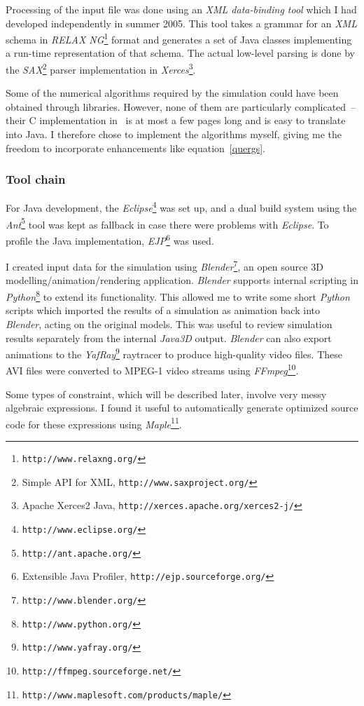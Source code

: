 Processing of the input file was done using an \textsl{XML data-binding tool} which I had
developed independently in summer 2005. This tool takes a grammar for an \textsl{XML} schema in
\textsl{RELAX NG}\footnote{\texttt{http://www.relaxng.org/}} format and generates a set of
Java classes implementing a run-time representation of that schema. The actual low-level parsing
is done by the \textsl{SAX}\footnote{Simple API for XML, \texttt{http://www.saxproject.org/}}
parser implementation in \textsl{Xerces}\footnote{Apache Xerces2 Java,
\texttt{http://xerces.apache.org/xerces2-j/}}.

Some of the numerical algorithms required by the simulation could have been obtained through
libraries. However, none of them are particularly complicated~-- their C implementation
in~\cite{NRinC} is at most a few pages long and is easy to translate into Java. I therefore chose
to implement the algorithms myself, giving me the freedom to incorporate enhancements like
equation~\ref{quergs}.

\subsubsection{Tool chain}
For Java development, the \textsl{Eclipse}\footnote{\texttt{http://www.eclipse.org/}} was set up,
and a dual build system using the \textsl{Ant}\footnote{\texttt{http://ant.apache.org/}} tool
was kept as fallback in case there were problems with \textsl{Eclipse}. To profile the Java
implementation, \textsl{EJP}\footnote{Extensible Java Profiler, \texttt{http://ejp.sourceforge.org/}}
was used.

I created input data for the simulation using \textsl{Blender}\footnote{\texttt{http://www.blender.org/}},
an open source 3D modelling/animation/rendering application. \textsl{Blender} supports internal
scripting in \textsl{Python}\footnote{\texttt{http://www.python.org/}} to extend its functionality.
This allowed me to write some short \textsl{Python} scripts which imported the results of a
simulation as animation back into \textsl{Blender}, acting on the original models. This was useful
to review simulation results separately from the internal \textsl{Java3D} output. \textsl{Blender}
can also export animations to the \textsl{YafRay}\footnote{\texttt{http://www.yafray.org/}}
raytracer to produce high-quality video files. These AVI files were converted to MPEG-1 video
streams using \textsl{FFmpeg}\footnote{\texttt{http://ffmpeg.sourceforge.net/}}.

Some types of constraint, which will be described later, involve very messy algebraic expressions.
I found it useful to automatically generate optimized source code for these expressions
using \textsl{Maple}\footnote{\texttt{http://www.maplesoft.com/products/maple/}}.

